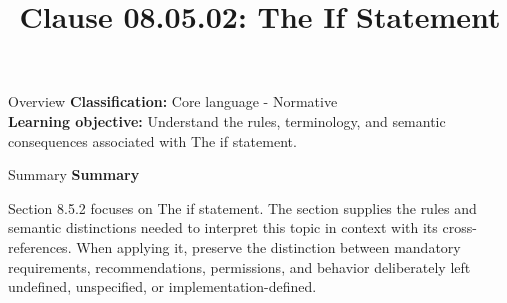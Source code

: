 \documentclass[10pt,letterpaper]{article}
\title{Clause 08.05.02: The If Statement}
\author{}
\date{}
\begin{document}
\maketitle
\begin{CornellOverviewBox}{Overview}
\textbf{Classification:} Core language - Normative\\[2pt]
\textbf{Learning objective:} Understand the rules, terminology, and semantic consequences associated with The if statement.
\end{CornellOverviewBox}\begin{CornellSummaryBox}{Summary}
{\sffamily\bfseries\color{Accent} Summary}\par\vspace{3pt}Section 8.5.2 focuses on The if statement. The section supplies the rules and semantic distinctions needed to interpret this topic in context with its cross-references. When applying it, preserve the distinction between mandatory requirements, recommendations, permissions, and behavior deliberately left undefined, unspecified, or implementation-defined.
\end{CornellSummaryBox}
\end{document}
